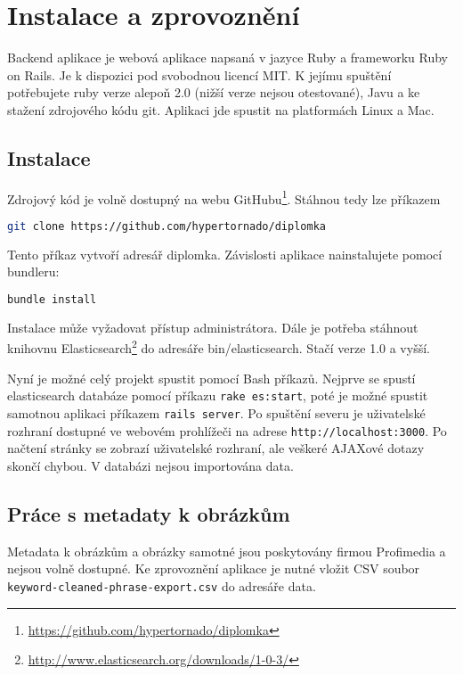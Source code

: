 \chapter{Instalace a zprovoznění}
\label{chap:implementace}

Backend aplikace je webová aplikace napsaná v jazyce Ruby a frameworku Ruby on Rails. Je k dispozici pod svobodnou licencí MIT. K jejímu spuštění potřebujete ruby verze alepoň 2.0 (nižší verze nejsou otestované), Javu a ke stažení zdrojového kódu git. Aplikaci jde spustit na platformách Linux a Mac.

\section{Instalace}

Zdrojový kód je volně dostupný na webu GitHubu\footnote{\url{https://github.com/hypertornado/diplomka}}. Stáhnou tedy lze příkazem

\begin{lstlisting}[language=bash]
git clone https://github.com/hypertornado/diplomka
\end{lstlisting}

Tento příkaz vytvoří adresář diplomka. Závislosti aplikace nainstalujete pomocí bundleru:

\begin{lstlisting}[language=bash]
bundle install
\end{lstlisting}

Instalace může vyžadovat přístup administrátora. Dále je potřeba stáhnout knihovnu Elasticsearch\footnote{\url{http://www.elasticsearch.org/downloads/1-0-3/}} do adresáře bin/elasticsearch. Stačí verze 1.0 a vyšší.

Nyní je možné celý projekt spustit pomocí Bash příkazů. Nejprve se spustí elasticsearch databáze pomocí příkazu \lstinline{rake es:start}, poté je možné spustit samotnou aplikaci příkazem \lstinline{rails server}. Po spuštění severu je uživatelské rozhraní dostupné ve webovém prohlížeči na adrese \lstinline{http://localhost:3000}. Po načtení stránky se zobrazí uživatelské rozhraní, ale veškeré AJAXové dotazy skončí chybou. V databázi nejsou importována data.

\section{Práce s metadaty k obrázkům}

Metadata k obrázkům a obrázky samotné jsou poskytovány firmou Profimedia a nejsou volně dostupné. Ke zprovoznění aplikace je nutné vložit CSV soubor \lstinline{keyword-cleaned-phrase-export.csv} do adresáře data.

